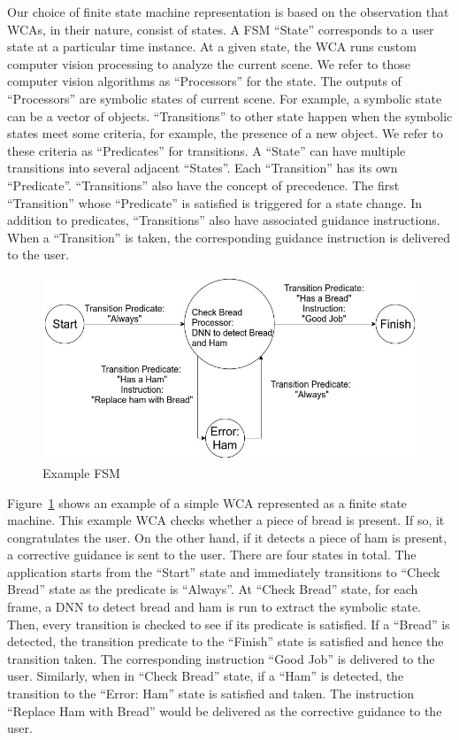 Our choice of finite state machine representation is based on the observation
that WCAs, in their nature, consist of states. A FSM ``State'' corresponds to a
user state at a particular time instance. At a given state, the WCA runs custom
computer vision processing to analyze the current scene. We refer to those
computer vision algorithms as ``Processors'' for the state. The outputs of
``Processors'' are symbolic states of current scene. For example, a symbolic
state can be a vector of objects. ``Transitions'' to other state happen when the
symbolic states meet some criteria, for example, the presence of a new object.
We refer to these criteria as ``Predicates'' for transitions. A ``State'' can
have multiple transitions into several adjacent ``States''. Each ``Transition''
has its own ``Predicate''. ``Transitions'' also have the concept of precedence.
The first ``Transition'' whose ``Predicate'' is satisfied is triggered for a
state change. In addition to predicates, ``Transitions'' also have associated
guidance instructions. When a ``Transition'' is taken, the corresponding
guidance instruction is delivered to the user.


\begin{figure}
  \centering
  \includegraphics[trim={0 0 0 0},width=\linewidth]{FIGS/fsm-example}
	\caption{Example FSM}
    \label{figs:fsm-example}
\end{figure}

Figure~\ref{figs:fsm-example} shows an example of a simple WCA represented as a
finite state machine. This example WCA checks whether a piece of bread is
present. If so, it congratulates the user. On the other hand, if it detects a
piece of ham is present, a corrective guidance is sent to the user. There are
four states in total. The application starts from the ``Start'' state and
immediately transitions to ``Check Bread'' state as the predicate is ``Always''.
At ``Check Bread'' state, for each frame, a DNN to detect bread and ham is run
to extract the symbolic state. Then, every transition is checked to see if its
predicate is satisfied. If a ``Bread'' is detected, the transition predicate to
the ``Finish'' state is satisfied and hence the transition taken. The
corresponding instruction ``Good Job'' is delivered to the user. Similarly, when
in ``Check Bread'' state, if a ``Ham'' is detected, the transition to the
``Error: Ham'' state is satisfied and taken. The instruction ``Replace Ham with
Bread'' would be delivered as the corrective guidance to the user.

